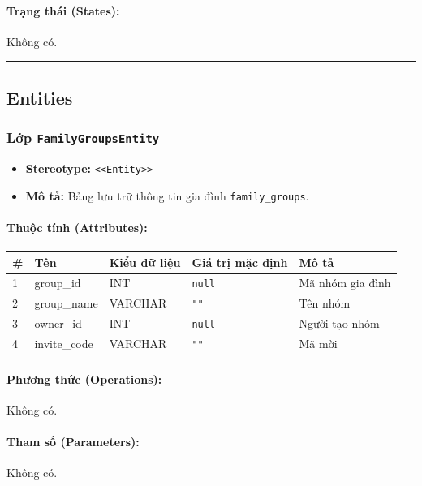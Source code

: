 \documentclass[12pt,a4paper]{article}
\begin{document}
\paragraph{Trạng thái (States):}
Không có.

\vskip 0.5cm
\noindent\rule{\textwidth}{0.5pt}
\vskip 0.5cm

\subsection{Entities}

\subsubsection{Lớp \texttt{FamilyGroupsEntity}}
\begin{itemize}[leftmargin=*]
    \item \textbf{Stereotype:} \texttt{\textless{}\textless{}Entity\textgreater{}\textgreater{}}
    \item \textbf{Mô tả:} Bảng lưu trữ thông tin gia đình \texttt{family\_groups}.
\end{itemize}

\paragraph{Thuộc tính (Attributes):}
\begin{longtable}{|p{0.6cm}|p{2.8cm}|p{2.2cm}|p{1.8cm}|p{5.8cm}|}
\hline
\textbf{\#} & \textbf{Tên} & \textbf{Kiểu dữ liệu} & \textbf{Giá trị mặc định} & \textbf{Mô tả} \\ \hline
\endhead
1 & group\_id & INT & \texttt{null} & Mã nhóm gia đình \\ \hline
2 & group\_name & VARCHAR & \texttt{""} & Tên nhóm \\ \hline
3 & owner\_id & INT & \texttt{null} & Người tạo nhóm \\ \hline
4 & invite\_code & VARCHAR & \texttt{""} & Mã mời \\ \hline
\end{longtable}

\paragraph{Phương thức (Operations):}
Không có.

\paragraph{Tham số (Parameters):}
Không có.
\end{document}
